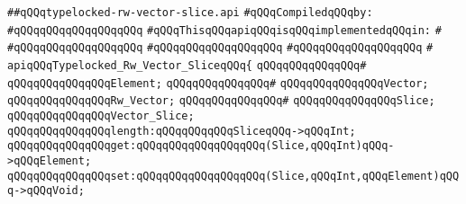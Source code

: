 \label{src/lib/std/src/typelocked-rw-vector-slice.api}
\verb|##qQQqtypelocked-rw-vector-slice.api|\newline
\newline
\verb|#qQQqCompiledqQQqby:|\newline
\verb|#qQQqqQQqqQQqqQQqqQQq|\newline
\newline
\newline
\newline
\verb|#qQQqThisqQQqapiqQQqisqQQqimplementedqQQqin:|\newline
\verb|#|\newline
\verb|#qQQqqQQqqQQqqQQqqQQq|\newline
\verb|#qQQqqQQqqQQqqQQqqQQq|\newline
\verb|#qQQqqQQqqQQqqQQqqQQq|\newline
\verb|#|\newline
\verb|apiqQQqTypelocked_Rw_Vector_SliceqQQq{|\newline
\verb|qQQqqQQqqQQqqQQq#|\newline
\verb|qQQqqQQqqQQqqQQqElement;|\newline
\verb|qQQqqQQqqQQqqQQq#|\newline
\verb|qQQqqQQqqQQqqQQqVector;|\newline
\verb|qQQqqQQqqQQqqQQqRw_Vector;|\newline
\verb|qQQqqQQqqQQqqQQq#|\newline
\verb|qQQqqQQqqQQqqQQqSlice;|\newline
\verb|qQQqqQQqqQQqqQQqVector_Slice;|\newline
\newline
\verb|qQQqqQQqqQQqqQQqlength:qQQqqQQqqQQqSliceqQQq->qQQqInt;|\newline
\newline
\verb|qQQqqQQqqQQqqQQqget:qQQqqQQqqQQqqQQqqQQq(Slice,qQQqInt)qQQq->qQQqElement;|\newline
\verb|qQQqqQQqqQQqqQQqset:qQQqqQQqqQQqqQQqqQQq(Slice,qQQqInt,qQQqElement)qQQq->qQQqVoid;|\newline
\newline
